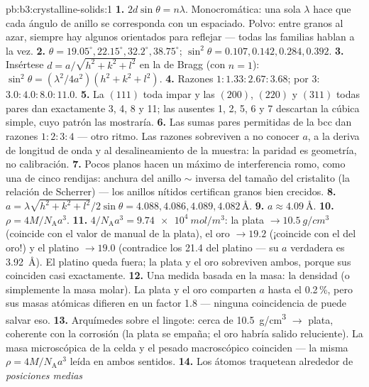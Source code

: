 \begin{solution}{pb:b3:crystalline-solids:1}
\textbf{1.} $2d\sin\theta = n\lambda$. Monocromática: una sola
$\lambda$ hace que cada ángulo de anillo se corresponda con un espaciado. Polvo: entre
granos al azar, siempre hay algunos orientados para reflejar --- todas
las familias hablan a la vez.
\textbf{2.} $\theta = 19.05^\circ, 22.15^\circ, 32.2^\circ,
38.75^\circ$; $\sin^2\theta = 0.107, 0.142, 0.284, 0.392$.
\textbf{3.} Insértese $d = a/\sqrt{h^2+k^2+l^2}$ en la de Bragg
(con $n = 1$): $\sin^2\theta = (\lambda^2/4a^2)(h^2+k^2+l^2)$.
\textbf{4.} Razones $1 : 1.33 : 2.67 : 3.68$; por 3:
$3.0 : 4.0 : 8.0 : 11.0$.
\textbf{5.} La $(111)$ toda impar y las $(200)$, $(220)$ y
$(311)$ todas pares dan exactamente 3, 4, 8 y 11; las ausentes 1, 2, 5, 6 y 7 descartan
la cúbica simple, cuyo patrón las mostraría.
\textbf{6.} Las sumas pares permitidas de la bcc dan razones
$1:2:3:4$ --- otro ritmo. Las razones sobreviven a no conocer
$a$, a la deriva de longitud de onda y al desalineamiento de la muestra: la paridad es
geometría, no calibración.
\textbf{7.} Pocos planos hacen un máximo de interferencia romo, como una
 de cinco rendijas: anchura del anillo $\sim$ inversa del tamaño del
cristalito (la relación de Scherrer) --- los anillos nítidos certifican granos
bien crecidos.
\textbf{8.} $a = \lambda\sqrt{h^2+k^2+l^2}/2\sin\theta = 4.088,
4.086, 4.089, 4.082\,\unit{\angstrom}$.
\textbf{9.} $a \approx \qty{4.09}{\angstrom}$.
\textbf{10.} $\rho = 4M/N_{\text{A}}a^3$.
\textbf{11.} $4/N_{\text{A}}a^3 = \qty{9.74e4}{mol/m^3}$:
la plata $\to \qty{10.5}{g/cm^3}$ (coincide con el valor de manual de la plata),
el oro $\to 19.2$ (¡coincide con el del oro!) y el platino $\to 19.0$
(contradice los 21.4 del platino --- su $a$ verdadera es
\qty{3.92}{\angstrom}). El platino queda fuera; la plata y el oro
sobreviven ambos, porque sus  coinciden casi exactamente.
\textbf{12.} Una medida basada en la masa: la densidad (o simplemente la masa
molar). La plata y el oro comparten $a$ hasta el 0.2\,\%, pero sus masas
atómicas difieren en un factor 1.8 --- ninguna coincidencia de  puede
salvar eso.
\textbf{13.} Arquímedes sobre el lingote: cerca de \qty{10.5}{g/cm^3}
$\to$ plata, coherente con la corrosión (la plata se empaña;
el oro habría salido reluciente). La masa microscópica de la celda y el
pesado macroscópico coinciden --- la misma
$\rho = 4M/N_{\text{A}}a^3$ leída en ambos sentidos.
\textbf{14.} Los átomos traquetean alrededor de \emph{posiciones medias
}
\end{solution}
